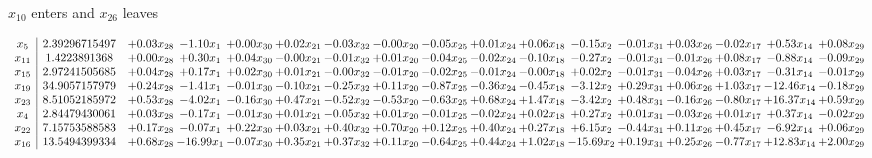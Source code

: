 \documentclass[9pt]{article}
\begin{document}
 $ x_{10} $ enters and $ x_{26} $ leaves 

 \[\begin{array}{c| c c@{\hskip 2pt} c@{\hskip 2pt} c@{\hskip 2pt} c@{\hskip 2pt} c@{\hskip 2pt} c@{\hskip 2pt} c@{\hskip 2pt} c@{\hskip 2pt} c@{\hskip 2pt} c@{\hskip 2pt} c@{\hskip 2pt} c@{\hskip 2pt} c@{\hskip 2pt} c@{\hskip 2pt} c@{\hskip 2pt} }
 x_{5}   &  2.39296715497 & +  0.03 x_{28} & -1.10 x_{1} & +  0.00 x_{30} & +  0.02 x_{21} & -0.03 x_{32} & -0.00 x_{20} & -0.05 x_{25} & +  0.01 x_{24} & +  0.06 x_{18} & -0.15 x_{2} & -0.01 x_{31} & +  0.03 x_{26} & -0.02 x_{17} & +  0.53 x_{14} & +  0.08 x_{29}\\
 x_{11}   &  1.4223891368 & +  0.00 x_{28} & +  0.30 x_{1} & +  0.04 x_{30} & -0.00 x_{21} & -0.01 x_{32} & +  0.01 x_{20} & -0.04 x_{25} & -0.02 x_{24} & -0.10 x_{18} & -0.27 x_{2} & -0.01 x_{31} & -0.01 x_{26} & +  0.08 x_{17} & -0.88 x_{14} & -0.09 x_{29}\\
 x_{15}   &  2.97241505685 & +  0.04 x_{28} & +  0.17 x_{1} & +  0.02 x_{30} & +  0.01 x_{21} & -0.00 x_{32} & -0.01 x_{20} & -0.02 x_{25} & -0.01 x_{24} & -0.00 x_{18} & +  0.02 x_{2} & -0.01 x_{31} & -0.04 x_{26} & +  0.03 x_{17} & -0.31 x_{14} & -0.01 x_{29}\\
 x_{19}   &  34.9057157979 & +  0.24 x_{28} & -1.41 x_{1} & -0.01 x_{30} & -0.10 x_{21} & -0.25 x_{32} & +  0.11 x_{20} & -0.87 x_{25} & -0.36 x_{24} & -0.45 x_{18} & -3.12 x_{2} & +  0.29 x_{31} & +  0.06 x_{26} & +  1.03 x_{17} & -12.46 x_{14} & -0.18 x_{29}\\
 x_{23}   &  8.51052185972 & +  0.53 x_{28} & -4.02 x_{1} & -0.16 x_{30} & +  0.47 x_{21} & -0.52 x_{32} & -0.53 x_{20} & -0.63 x_{25} & +  0.68 x_{24} & +  1.47 x_{18} & -3.42 x_{2} & +  0.48 x_{31} & -0.16 x_{26} & -0.80 x_{17} & + 16.37 x_{14} & +  0.59 x_{29}\\
 x_{4}   &  2.84479430061 & +  0.03 x_{28} & -0.17 x_{1} & -0.01 x_{30} & +  0.01 x_{21} & -0.05 x_{32} & +  0.01 x_{20} & -0.01 x_{25} & -0.02 x_{24} & +  0.02 x_{18} & +  0.27 x_{2} & +  0.01 x_{31} & -0.03 x_{26} & +  0.01 x_{17} & +  0.37 x_{14} & -0.02 x_{29}\\
 x_{22}   &  7.15753588583 & +  0.17 x_{28} & -0.07 x_{1} & +  0.22 x_{30} & +  0.03 x_{21} & +  0.40 x_{32} & +  0.70 x_{20} & +  0.12 x_{25} & +  0.40 x_{24} & +  0.27 x_{18} & +  6.15 x_{2} & -0.44 x_{31} & +  0.11 x_{26} & +  0.45 x_{17} & -6.92 x_{14} & +  0.06 x_{29}\\
 x_{16}   &  13.5494399334 & +  0.68 x_{28} & -16.99 x_{1} & -0.07 x_{30} & +  0.35 x_{21} & +  0.37 x_{32} & +  0.11 x_{20} & -0.64 x_{25} & +  0.44 x_{24} & +  1.02 x_{18} & -15.69 x_{2} & +  0.19 x_{31} & +  0.25 x_{26} & -0.77 x_{17} & + 12.83 x_{14} & +  2.00 x_{29}\\

\end{array}\]
\end{document}
